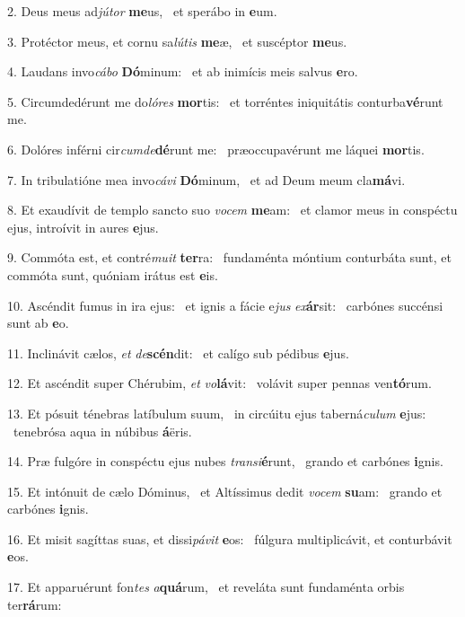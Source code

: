 2. Deus meus ad\textit{jú}\textit{tor} \textbf{me}us, \ast\  et sperábo in \textbf{e}um.\

3. Protéctor meus, et cornu sa\textit{lú}\textit{tis} \textbf{me}æ, \ast\  et suscéptor \textbf{me}us.\

4. Laudans invo\textit{cá}\textit{bo} \textbf{Dó}minum: \ast\  et ab inimícis meis salvus \textbf{e}ro.\

5. Circumdedérunt me do\textit{ló}\textit{res} \textbf{mor}tis: \ast\  et torréntes iniquitátis conturba\textbf{vé}runt me.\

6. Dolóres inférni cir\textit{cum}\textit{de}\textbf{dé}runt me: \ast\  præoccupavérunt me láquei \textbf{mor}tis.\

7. In tribulatióne mea invo\textit{cá}\textit{vi} \textbf{Dó}minum, \ast\  et ad Deum meum cla\textbf{má}vi.\

8. Et exaudívit de templo sancto suo \textit{vo}\textit{cem} \textbf{me}am: \ast\  et clamor meus in conspéctu ejus, introívit in aures \textbf{e}jus.\

9. Commóta est, et contré\textit{mu}\textit{it} \textbf{ter}ra: \ast\  fundaménta móntium conturbáta sunt, et commóta sunt, quóniam irátus est \textbf{e}is.\

10. Ascéndit fumus in ira ejus: \dag\  et ignis a fácie e\textit{jus} \textit{ex}\textbf{ár}sit: \ast\  carbónes succénsi sunt ab \textbf{e}o.\

11. Inclinávit cælos, \textit{et} \textit{de}\textbf{scén}dit: \ast\  et calígo sub pédibus \textbf{e}jus.\

12. Et ascéndit super Chérubim, \textit{et} \textit{vo}\textbf{lá}vit: \ast\  volávit super pennas ven\textbf{tó}rum.\

13. Et pósuit ténebras latíbulum suum, \dag\  in circúitu ejus taberná\textit{cu}\textit{lum} \textbf{e}jus: \ast\  tenebrósa aqua in núbibus \textbf{á}ëris.\

14. Præ fulgóre in conspéctu ejus nubes \textit{trans}\textit{i}\textbf{é}runt, \ast\  grando et carbónes \textbf{i}gnis.\

15. Et intónuit de cælo Dóminus, \dag\  et Altíssimus dedit \textit{vo}\textit{cem} \textbf{su}am: \ast\  grando et carbónes \textbf{i}gnis.\

16. Et misit sagíttas suas, et dissi\textit{pá}\textit{vit} \textbf{e}os: \ast\  fúlgura multiplicávit, et conturbávit \textbf{e}os.\

17. Et apparuérunt fon\textit{tes} \textit{a}\textbf{quá}rum, \ast\  et reveláta sunt fundaménta orbis ter\textbf{rá}rum:\

